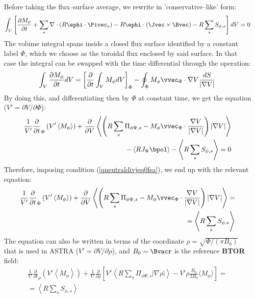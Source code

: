 Before taking the flux--surface average, we rewrite  in 'conservative--like' form:
\begin{eqnarray}
\int_V\left[\frac{\partial M_\phi}{\partial{t}} +
\sum_s \nabla\cdot\left(R\ephi\cdot\Pivec_s\right)-R\ephi\cdot\left(
\Jvec\times\Bvec\right)  - R \sum_s S_{\phi,s}\right] dV=0
\label{momtranspeq3drephi2cons}
\end{eqnarray}
The volume integral spans inside a closed flux surface identified by a constant label $\Phi$, which we choose as the toroidal flux enclosed by said surface. In that case the integral can be swapped with the time differential through the operation:
\begin{eqnarray}
 \int_V \frac{\partial M_\phi}{\partial{t}} dV=\left[\frac{\partial }{\partial t}  \int_V M_\phi dV \right]_{\Phi} -\oint_{\Phi} M_\phi \vvec_{\Phi}\cdot \nabla{V} \frac{dS}{|\nabla{V}|}
\label{momtranspeq3drephi2consswap}
\end{eqnarray}
By doing this, and differentiating then by $\Phi$ at constant time, we get the equation ($V'=\partial V/\partial \Phi$):
\begin{eqnarray}
\frac{1}{V'}  \frac{\partial }{\partial{t}}_{\Phi}\left(V' \left\langle M_\phi \right\rangle\right) +\frac{\partial}{\partial V}\left\langle \left(R \sum_s \Pi_{\phi\Psi,s}-M_\phi\vvec_{\Phi}\cdot\frac{\nabla{V}}{|\nabla{V}|}\right)
|\nabla{V}| \right\rangle\nonumber \\
-\left\langle R J_\Psi\bpol\right\rangle  -
\left\langle R \sum_s S_{\phi,s}\right\rangle=0
\label{momtranspeq3drephi2cons}
\end{eqnarray}
Therefore, imposing condition (\ref{qneutraldivjeq0fsa}), we end up with the relevant equation:
\begin{eqnarray}
\frac{1}{V'}  \frac{\partial }{\partial{t}}_{\Phi}\left(V' \left\langle M_\phi \right\rangle\right) + \frac{\partial}{\partial V}\left\langle \left(R \sum_s \Pi_{\phi\Psi,s}-M_\phi\vvec_{\Phi}\cdot\frac{\nabla{V}}{|\nabla{V}|}\right)
|\nabla{V}| \right\rangle=\nonumber \\
=\left\langle R \sum_s S_{\phi,s}\right\rangle
\label{momtranspeq3drephiFSA}
\end{eqnarray}
The equation can also be written in terms of the coordinate $\rho=\sqrt{\Phi/(\pi B_0)}$ that is used in ASTRA ($V'=\partial V/\partial \rho$), and $B_0=\Bvacr$ is the reference {\bf BTOR} field:
\begin{eqnarray}
\frac{1}{V'} \frac{\partial }{\partial{t}}_{\rho}\left(V' \left\langle M_\phi \right\rangle\right) +\frac{1}{V'}  \frac{\partial}{\partial \rho}\left[ V' \left\langle R \sum_s \Pi_{\phi\Psi,s}\vert \nabla{\rho}\vert\right\rangle
-V'\rho\frac{\dot{B}_0}{2 B_0}\langle  M_\phi \rangle \right]
=\nonumber \\
=\left\langle R \sum_s S_{\phi,s}\right\rangle
\label{momtranspeq3drephiFSArho}
\end{eqnarray}
